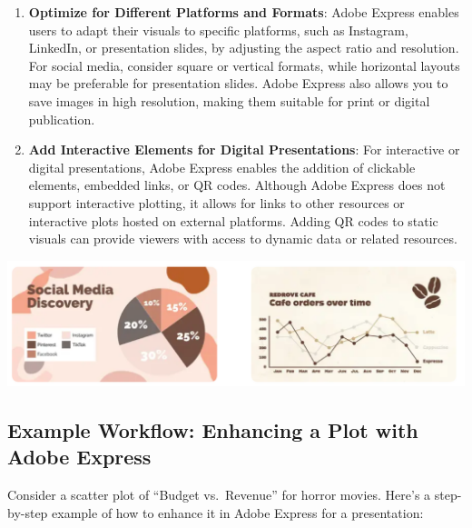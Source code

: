 \documentclass[
]{book}
\begin{document}
\begin{enumerate}
\item
  \textbf{Optimize for Different Platforms and Formats}: Adobe Express enables users to adapt their visuals to specific platforms, such as Instagram, LinkedIn, or presentation slides, by adjusting the aspect ratio and resolution. For social media, consider square or vertical formats, while horizontal layouts may be preferable for presentation slides. Adobe Express also allows you to save images in high resolution, making them suitable for print or digital publication.
\item
  \textbf{Add Interactive Elements for Digital Presentations}: For interactive or digital presentations, Adobe Express enables the addition of clickable elements, embedded links, or QR codes. Although Adobe Express does not support interactive plotting, it allows for links to other resources or interactive plots hosted on external platforms. Adding QR codes to static visuals can provide viewers with access to dynamic data or related resources.
\end{enumerate}

\href{https://www.adobe.com/express/learn/blog/data-visualization}{\includegraphics[width=1\textwidth,height=\textheight]{images/express_plots.png}}

\subsection*{Example Workflow: Enhancing a Plot with Adobe Express}\label{example-workflow-enhancing-a-plot-with-adobe-express}

Consider a scatter plot of ``Budget vs.~Revenue'' for horror movies. Here's a step-by-step example of how to enhance it in Adobe Express for a presentation:
\end{document}
